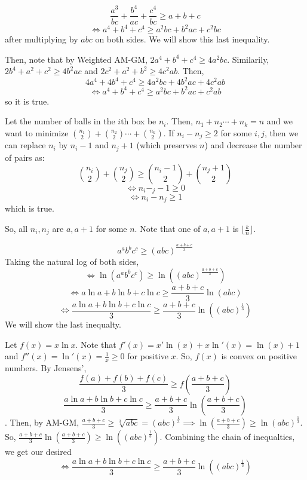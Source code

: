 \documentclass[11pt]{article}
\begin{document}

\begin{sol}
$$\frac{a^3}{bc}+\frac{b^4}{ac}+\frac{c^4}{bc} \ge a + b + c$$
$$\iff a^4+b^4+c^4 \ge a^2bc+b^2ac+c^2bc$$ after multiplying by $abc$ on both sides.
We will show this last inequality.

Then, note that by Weighted AM-GM, $2a^4+b^4+c^4\ge 4a^2bc$. Similarily, $2b^4+a^2+c^2\ge 4b^2ac$ and $2c^2+a^2+b^2\ge 4c^2ab$. Then,
$$4a^4+4b^4+c^4\ge 4a^2bc+4b^2ac+4c^2ab$$
$$\iff a^4+b^4+c^4\ge a^2bc+b^2ac+c^2ab$$
so it is true.
\end{sol}


\begin{sol}
Let the number of balls in the  $i$th box be $n_{i}$. Then, $n_{1}+n_{2}\cdots + n_{k}=n$ and we want to minimize $\binom{n_{1}}{2}+\binom{n_{2}}{2}\cdots + \binom{n_{k}}{2}$. If $n_{i}-n_{j}\ge 2$ for some $i,j$, then we can replace $n_{i}$ by $n_{i}-1$ and $n_{j}+1$ (which preserves $n$) and decrease the number of pairs as:
$$\binom{n_{i}}{2}+\binom{n_{j}}{2} \ge \binom{n_{i}-1}{2} + \binom{n_{j}+1}{2}$$
$$\iff n_{i}-_{j}-1\ge 0$$
$$\iff n_{i}-n_{j}\ge 1$$
which is true.

So, all $n_{i},n_{j}$ are $a,a+1$ for some $n$. Note that one of $a,a+1$ is $\lfloor \frac{k}{n} \rfloor$.
\end{sol}


\begin{sol}
$$a^{a}b^{b}c^{c} \ge (abc)^{\frac{a+b+c}{3}}$$
Taking the natural log of both sides, $$\iff \ln (a^{a}b^{b}c^{c}) \ge \ln((abc)^{\frac{a+b+c}{3}})$$
$$\iff a\ln a + b\ln b + c\ln c \ge \frac{a+b+c}{3} \ln(abc)$$
$$\iff \frac{a\ln a + b\ln b + c\ln c}{3} \ge \frac{a+b+c}{3} \ln((abc)^{\frac{1}{3}})$$
We will show the last inequalty.

Let $f(x)=x \ln x$. Note that $f'(x) = x'\ln(x)+x \ln'(x) = \ln(x)+1$ and $f''(x)=\ln'(x)=\frac{1}{x}\ge 0$ for positive $x$. So, $f(x)$ is convex on positive numbers. By Jensens',
$$\frac{f(a)+f(b)+f(c)}{3}\ge f(\frac{a+b+c}{3})$$
$$\frac{a\ln a +  b\ln b + c \ln c}{3} \ge \frac{a+b+c}{3} \ln (\frac{a+b+c}{3})$$.
Then, by AM-GM, $\frac{a+b+c}{3}\ge \sqrt[3]{abc} = (abc)^{\frac{1}{3}}\implies \ln (\frac{a+b+c}{3}) \ge \ln (abc)^{\frac{1}{3}}$. So, $\frac{a+b+c}{3} \ln(\frac{a+b+c}{3}) \ge \ln((abc)^{\frac{1}{3}})$. Combining the chain of inequalties, we get our desired 
$$\iff \frac{a\ln a + b\ln b + c\ln c}{3} \ge \frac{a+b+c}{3} \ln((abc)^{\frac{1}{3}})$$
\end{sol}
\end{document}
